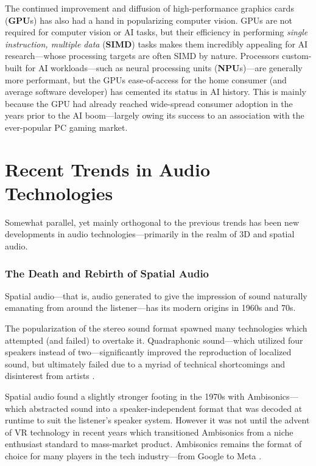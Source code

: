 \documentclass{report}
\newcommand{\tech}[1]{\textbf{#1}}
\begin{document}
The continued improvement and diffusion of high-performance graphics cards (\tech{GPU}s) has also had a hand in popularizing computer vision. GPUs are not required for computer vision or AI tasks, but their efficiency in performing \emph{single instruction, multiple data} (\textbf{SIMD}) tasks makes them incredibly appealing for AI research---whose processing targets are often SIMD by nature. Processors custom-built for AI workloads---such as neural processing units (\tech{NPU}s)---are generally more performant, but the GPUs ease-of-access for the home consumer (and average software developer) has cemented its status in AI history. This is mainly because the GPU had already reached wide-spread consumer adoption in the years prior to the AI boom---largely owing its success to an association with the ever-popular PC gaming market.


\section{Recent Trends in Audio Technologies}
Somewhat parallel, yet mainly orthogonal to the previous trends has been new developments in audio technologies---primarily in the realm of 3D and spatial audio.

\subsubsection{The Death and Rebirth of Spatial Audio}
Spatial audio---that is, audio generated to give the impression of sound naturally emanating from around the listener---has its modern origins in 1960s and 70s. 

The popularization of the stereo sound format spawned many technologies which attempted (and failed) to overtake it. Quadraphonic sound---which utilized four speakers instead of two---significantly improved the reproduction of localized sound, but ultimately failed due to a myriad of technical shortcomings and disinterest from artists \cite{Eguchi_1973}. 

Spatial audio found a slightly stronger footing in the 1970s with Ambisonics---which abstracted sound into a speaker-independent format that was decoded at runtime to suit the listener's speaker system. However it was not until the advent of VR technology in recent years which transitioned Ambisonics from a niche enthusiast standard to mass-market product. Ambisonics remains the format of choice for many players in the tech industry---from Google to Meta \cite{Google_2024}\cite{MetaPlatforms2024}. 
\end{document}
